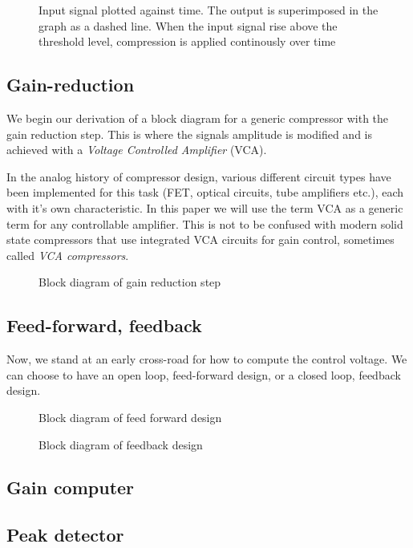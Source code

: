 \documentclass[]{article}
\begin{document}
\begin{figure}[ht]
\centering

\caption{Input signal plotted against time. The output is superimposed in the graph as a dashed line. When the input signal rise above the threshold level, compression is applied continously over time } 
\label{fig:envelope-graph}
\end{figure}


\subsection{Gain-reduction}
We begin our derivation of a block diagram for a generic compressor with the gain reduction step. This is where the signals amplitude is modified and is achieved with a \emph{Voltage Controlled Amplifier} (VCA).

In the analog history of compressor design, various different circuit types have been implemented for this task (FET, optical circuits, tube amplifiers etc.), each with it's own characteristic. In this paper we will use the term VCA as a generic term for any controllable amplifier. This is not to be confused with modern solid state compressors that use integrated VCA circuits for gain control, sometimes called \emph{VCA compressors}.


\begin{figure}[ht]
\centering

\caption{Block diagram of gain reduction step} 
\label{fig:vca-generic-blockdiagram}
\end{figure}





\subsection{Feed-forward, feedback}
Now, we stand at an early cross-road for how to compute the control voltage. We can choose to have an open loop, feed-forward design, or a closed loop, feedback design.

\begin{figure}[ht]
\centering

\caption{Block diagram of feed forward design} 
\label{fig:feedforward-blockdiagram}
\end{figure}

\begin{figure}[ht]
\centering

\caption{Block diagram of feedback design} 
\label{fig:feedback-blockdiagram}
\end{figure}

\subsection{Gain computer}
\subsection{Peak detector}



\end{document}
